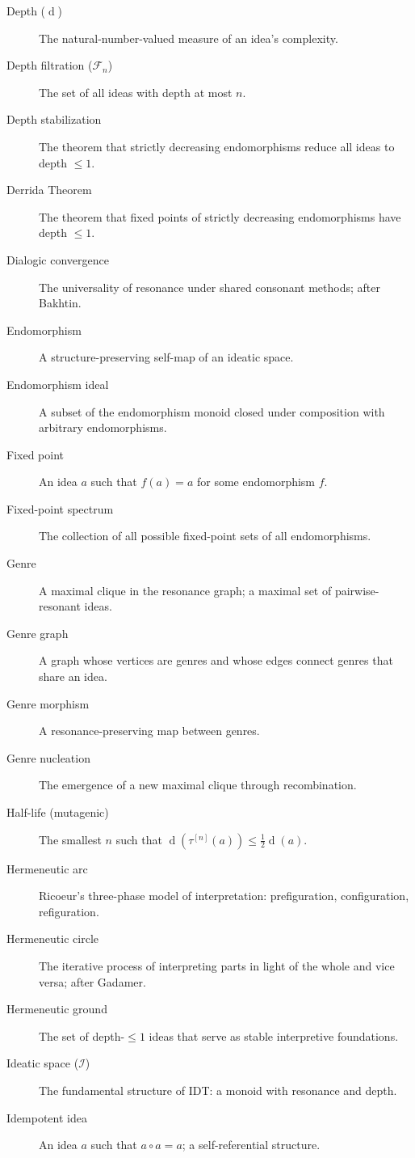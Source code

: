 \documentclass[11pt,openany]{book}
\theoremstyle{definition}
\theoremstyle{plain}
\theoremstyle{remark}
\newcommand{\IS}{\mathcal{I}}               %
\newcommand{\compose}{\circ}                 %
\newcommand{\depth}{\operatorname{d}}       %
\newcommand{\transmit}{\tau}                 %
\newcommand{\Filt}[1]{\mathcal{F}_{#1}}     %
\begin{document}
\begin{description}
\item[Depth ($\depth$)] The natural-number-valued measure of an idea's complexity.
\item[Depth filtration ($\Filt{n}$)] The set of all ideas with depth at most $n$.
\item[Depth stabilization] The theorem that strictly decreasing endomorphisms reduce all ideas to depth $\leq 1$.
\item[Derrida Theorem] The theorem that fixed points of strictly decreasing endomorphisms have depth $\leq 1$.
\item[Dialogic convergence] The universality of resonance under shared consonant methods; after Bakhtin.
\item[Endomorphism] A structure-preserving self-map of an ideatic space.
\item[Endomorphism ideal] A subset of the endomorphism monoid closed under composition with arbitrary endomorphisms.
\item[Fixed point] An idea $a$ such that $f(a) = a$ for some endomorphism $f$.
\item[Fixed-point spectrum] The collection of all possible fixed-point sets of all endomorphisms.
\item[Genre] A maximal clique in the resonance graph; a maximal set of pairwise-resonant ideas.
\item[Genre graph] A graph whose vertices are genres and whose edges connect genres that share an idea.
\item[Genre morphism] A resonance-preserving map between genres.
\item[Genre nucleation] The emergence of a new maximal clique through recombination.
\item[Half-life (mutagenic)] The smallest $n$ such that $\depth(\transmit^{[n]}(a)) \leq \frac{1}{2}\depth(a)$.
\item[Hermeneutic arc] Ricoeur's three-phase model of interpretation: prefiguration, configuration, refiguration.
\item[Hermeneutic circle] The iterative process of interpreting parts in light of the whole and vice versa; after Gadamer.
\item[Hermeneutic ground] The set of depth-$\leq 1$ ideas that serve as stable interpretive foundations.
\item[Ideatic space ($\IS$)] The fundamental structure of IDT: a monoid with resonance and depth.
\item[Idempotent idea] An idea $a$ such that $a \compose a = a$; a self-referential structure.

\end{description}
\end{document}
